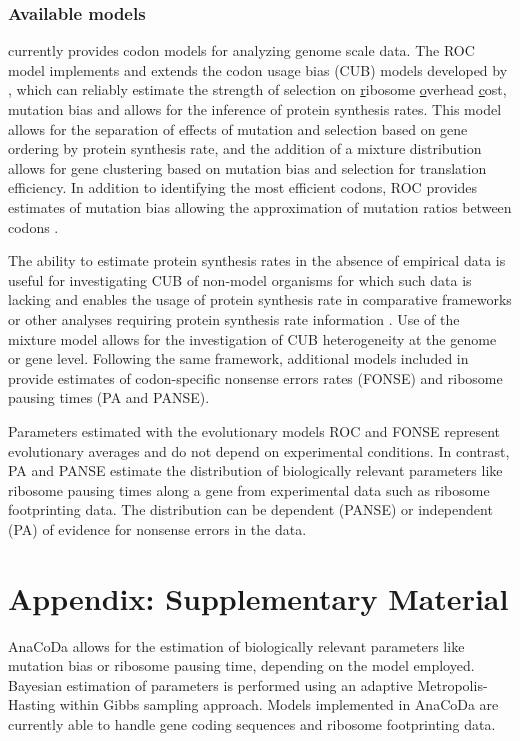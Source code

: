 \subsubsection{Available models}
\package currently provides codon models for analyzing genome scale data.
The ROC model implements and extends the codon usage bias (CUB) models developed by \citet{gilchrist2015,wallace2013,shah2011}, which can reliably estimate the strength of selection on \underline{r}ibosome \underline{o}verhead \underline{c}ost, mutation bias and allows for the inference of protein synthesis rates.
This model allows for the separation of effects of mutation and selection based on gene ordering by protein synthesis rate, and the addition of a mixture distribution allows for gene clustering based on mutation bias and selection for translation efficiency.
In addition to identifying the most efficient codons, ROC provides estimates of mutation bias allowing the approximation of mutation ratios between codons \citep{gilchrist2015,wallace2013}.

The ability to estimate protein synthesis rates in the absence of empirical data is useful for investigating CUB of non-model organisms for which such data is lacking and enables the usage of protein synthesis rate in comparative frameworks or other analyses requiring protein synthesis rate information \citep{dunn2018}.
Use of the mixture model allows for the investigation of CUB heterogeneity at the genome or gene level.  
Following the same framework, additional models included in \package provide estimates of codon-specific nonsense errors rates (FONSE) and ribosome pausing times (PA and PANSE).

Parameters estimated with the evolutionary models ROC and FONSE represent evolutionary averages and do not depend on experimental conditions. 
In contrast, PA and PANSE estimate the distribution of biologically relevant parameters like ribosome pausing times along a gene from experimental data such as ribosome footprinting data. 
The distribution can be dependent (PANSE) or independent (PA) of evidence for nonsense errors in the data.  


\section{Appendix: Supplementary Material}
AnaCoDa allows for the estimation of biologically relevant parameters like mutation bias or ribosome pausing
time, depending on the model employed. Bayesian estimation of parameters is performed using an adaptive
Metropolis-Hasting within Gibbs sampling approach. Models implemented in AnaCoDa are currently able to
handle gene coding sequences and ribosome footprinting data.

